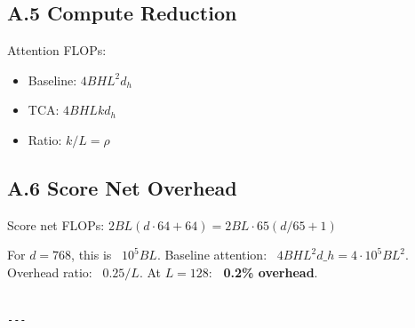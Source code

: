 \subsection{A.5 Compute Reduction}

Attention FLOPs:
\begin{itemize}
\item Baseline: $4 B H L^2 d_h$
\item TCA: $4 B H L k d_h$
\item Ratio: $k/L = \rho$

\end{itemize}
\subsection{A.6 Score Net Overhead}

Score net FLOPs: $2 B L (d \cdot 64 + 64) = 2 B L \cdot 65 (d/65 + 1)$

For $d = 768$, this is ~$10^5 B L$. Baseline attention: ~$4 B H L^2 d\_h = 
4 \cdot 10^5 B L^2$. Overhead ratio: ~$0.25 / L$. At $L = 128$: \textbf{~0.2\% overhead}.
\begin{lstlisting}

---
\end{lstlisting}